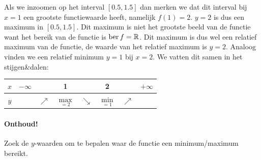 \documentclass[12pt,twoside]{article}
\begin{document}
Als we inzoomen op het interval $[0.5,1.5]$ dan merken we dat dit interval bij $x=1$ een grootste functiewaarde heeft, namelijk $f(1)=2$. $y=2$ is dus een maximum in $[0.5,1.5]$. Dit maximum is niet het grootste beeld van de functie want het bereik van de functie is $\ber f=\mathbb{R}$. Dit maximum is dus wel een relatief maximum van de functie, de waarde van het relatief maximum is $y=2$. Analoog vinden we een relatief minimum $y=1$ bij $x=2$. We vatten dit samen in het stijgen\&dalen:

\begin{center}
  \begin{tabular}{c|lcccccr}
  $x$ & $-\infty$ & & 1 & & 2 & & $+\infty$\\
  \hline
  $y$ & & $\nearrow$ & $\underset{=2}{\max}$ & $\searrow$ & $\underset{=1}{\min}$ & $\nearrow$
  \end{tabular}
\end{center}

\paragraph{Onthoud!} Zoek de $y$-waarden om te bepalen waar de functie een minimum/maximum bereikt.
\end{document}
